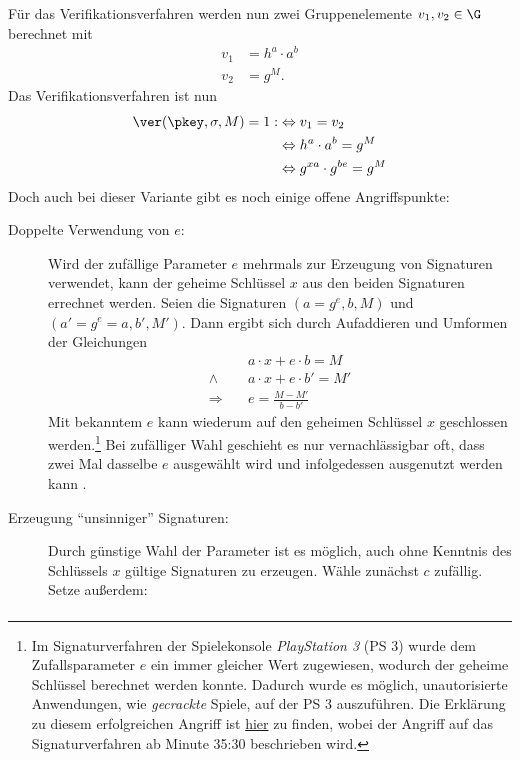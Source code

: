 Für das Verifikationsverfahren werden nun zwei Gruppenelemente $v_1,
v_2 \in \G$ berechnet mit
\begin{align*}
  v_1 &= h^a \cdot a^b\\
  v_2 &= g^M.
\end{align*}
Das Verifikationsverfahren ist nun
\begin{align*}
\ver(\pkey,\sigma,M) = 1 : & \Leftrightarrow v_1 = v_2 \\
 &\Leftrightarrow h^a \cdot a^b = g^M \\
 &\Leftrightarrow  g^{xa} \cdot g^{be} = g^M
\end{align*}
Doch auch bei dieser Variante gibt es noch einige offene Angriffspunkte:
\begin{description}
	\item[Doppelte Verwendung von $e$:]
	Wird der zufällige Parameter $e$ mehrmals zur Erzeugung von Signaturen verwendet, kann der geheime Schlüssel $x$ aus den beiden Signaturen errechnet werden. Seien die Signaturen $(a = g^e, b, M)$ und $(a' = g^{e} = a, b', M')$. Dann ergibt sich durch Aufaddieren und Umformen
	der Gleichungen
	\begin{align*}
	&a \cdot x + e \cdot b = M\\
	\land \quad &a \cdot x + e \cdot b' = M'\\
	\Rightarrow \quad &e = \frac{M - M'}{b - b'}
	\end{align*}
	Mit bekanntem $e$ kann wiederum auf den geheimen Schlüssel $x$
        geschlossen werden.\footnote{Im Signaturverfahren der
          Spielekonsole \textit{PlayStation 3} (PS 3) wurde dem
          Zufallsparameter $e$ ein immer gleicher Wert zugewiesen,
          wodurch der geheime Schlüssel berechnet werden konnte. Dadurch
          wurde es möglich, unautorisierte Anwendungen, wie
          \textit{gecrackte} Spiele, auf der PS 3 auszuführen. Die
          Erklärung zu diesem erfolgreichen Angriff ist
          \href{https://www.youtube.com/watch?v=4loZGYqaZ7I}{hier} zu
          finden, wobei der Angriff auf das Signaturverfahren ab Minute
          35:30 beschrieben wird.} Bei zufälliger Wahl geschieht es nur
        vernachlässigbar oft, dass zwei Mal dasselbe $e$ ausgewählt wird
        und infolgedessen ausgenutzt werden kann .
	\item[Erzeugung "`unsinniger"' Signaturen:]
	Durch günstige Wahl der Parameter ist es möglich, auch ohne Kenntnis des Schlüssels $x$ gültige Signaturen zu erzeugen. Wähle zunächst $c$
	zufällig. Setze außerdem:
	\begin{align*}

\end{align*}
\end{description}
